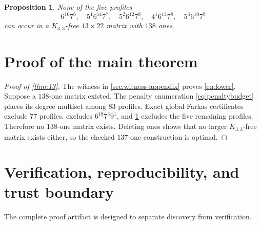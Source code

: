 \documentclass[11pt]{amsart}
\newtheorem{proposition}[theorem]{Proposition}
\begin{document}
\begin{proposition}\label{prop:five}
None of the five profiles
\[
6^{16}7^6,
\quad5^1 6^{14}7^7,
\quad5^2 6^{12}7^8,
\quad4^1 6^{13}7^8,
\quad5^3 6^{10}7^9
\]
can occur in a $K_{3,3}$-free $13\times22$ matrix with $138$ ones.
\end{proposition}

\section{Proof of the main theorem}
\begin{proof}[Proof of \cref{thm:13}]
The witness in \cref{sec:witness-appendix} proves \eqref{eq:lower}. Suppose a $138$-one matrix existed. The penalty enumeration \eqref{eq:penaltybudget} places its degree multiset among $83$ profiles. Exact global Farkas certificates exclude $77$ profiles.  excludes $6^{18}7^3 9^1$, and \cref{prop:five} excludes the five remaining profiles. Therefore no $138$-one matrix exists. Deleting ones shows that no larger $K_{3,3}$-free matrix exists either, so the checked $137$-one construction is optimal.
\end{proof}

\section{Verification, reproducibility, and trust boundary}
The complete proof artifact is designed to separate discovery from verification.
\end{document}
